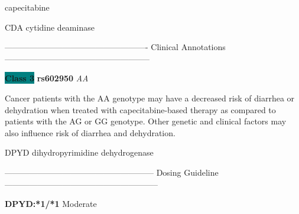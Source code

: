 \documentclass{resume} %
\begin{document}
\begin{rSection}{ capecitabine }
\begin{rSubsection}{ CDA }{ cytidine deaminase }{}{}
\item[] ---------------------------------------------------- Clinical Annotations -----------------------------------------------------\newline
\item \textbf{\colorbox{teal} {Class 3}} \textbf{ rs602950 } \textit{ AA }
\item[] Cancer patients with the AA genotype may have a decreased risk of diarrhea or dehydration when treated with capecitabine-based therapy as compared to patients with the AG or GG genotype. Other genetic and clinical factors may also influence risk of diarrhea and dehydration.
\end{rSubsection}\begin{rSubsection}{ DPYD }{ dihydropyrimidine dehydrogenase }{}{}
\item[]
\item[] ------------------------------------------------------ Dosing Guideline --------------------------------------------------------\newline
\item[]
\item[] \textbf{ DPYD:*1/*1 } Moderate


\end{rSubsection}
\end{rSection}
\end{document}
